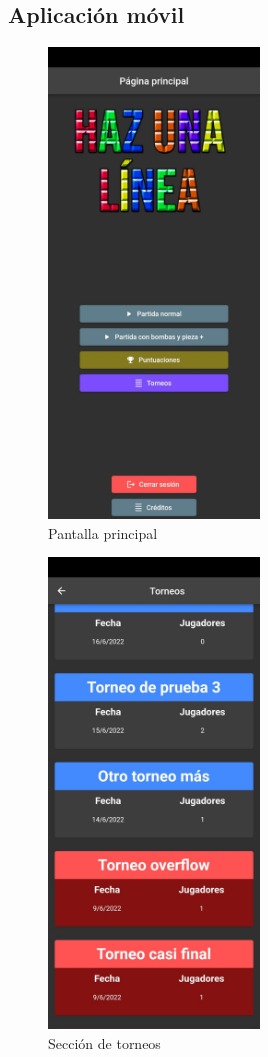 \documentclass{article}
\begin{document}
\subsection{Aplicación móvil}
\begin{figure}[H]
  \centering
  \includegraphics[width=0.5\textwidth]{imagenes/inicio.jpeg}
  \caption{Pantalla principal} 
\end{figure} 

\begin{figure}[H]
  \centering
  \includegraphics[width=0.5\textwidth]{imagenes/torneos.jpeg}
  \caption{Sección de torneos} 
\end{figure} 
\end{document}
